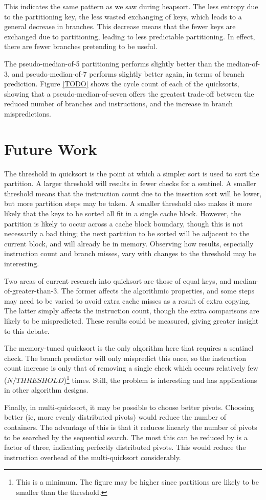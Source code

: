 This indicates the same pattern as we saw during heapsort.%
The less entropy due to the partitioning key, the less wasted exchanging of keys,
which leads to a general decrease in branches. This decrease means that the
fewer keys are exchanged due to partitioning, leading to less predictable
partitioning. In effect, there are fewer branches pretending to be useful.

The pseudo-median-of-5 partitioning performs slightly better than the
median-of-3, and pseudo-median-of-7 performs slightly better again, in
terms of branch prediction. Figure \ref{TODO} shows the cycle count of each of
the quicksorts, showing that a pseudo-median-of-seven offers the greatest
trade-off between the reduced number of branches and instructions, and the
increase in branch mispredictions. 



\section{Future Work}
The threshold in quicksort is the point at which a simpler sort is used to sort
the partition. A larger threshold will results in fewer checks for a sentinel. A
smaller threshold means that the instruction count due to the insertion sort
will be lower, but more partition steps may be taken. A smaller threshold also
makes it more likely that the keys to be sorted all fit in a single cache
block. However, the partition is likely to occur across a cache block boundary,
though this is not necessarily a bad thing; the next partition to be sorted will
be adjacent to the current block, and will already be in memory. Observing how
results, especially instruction count and branch misses, vary with changes 
to the threshold may be interesting.

Two areas of current research into quicksort are those of equal keys, and
median-of-greater-than-3. The former affects the algorithmic properties, and
some steps may need to be varied to avoid extra cache misses as a result
of extra copying. The latter simply affects the instruction count, though the
extra comparisons are likely to be mispredicted. These results could be
measured, giving greater insight to this debate.

The memory-tuned quicksort is the only algorithm here that requires a sentinel
check. The branch predictor will only mispredict this once, so the instruction
count increase is only that of removing a single check which occurs relatively
few ($N / THRESHOLD$)\footnote{This is a minimum. The figure may be higher since
partitions are likely to be smaller than the threshold.} times. Still, the
problem is interesting and has applications in other algorithm designs.

Finally, in multi-quicksort, it may be possible to choose better pivots.
Choosing better (ie, more evenly distributed pivots) would reduce the number of
containers. The advantage of this is that it reduces linearly the number of
pivots to be searched by the sequential search. The most this can be reduced by
is a factor of three, indicating perfectly distributed pivots. This would reduce
the instruction overhead of the multi-quicksort considerably.
